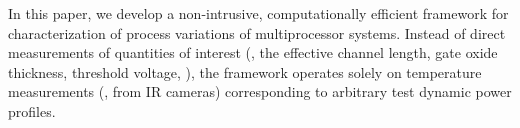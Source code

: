 In this paper, we develop a non-intrusive, computationally efficient framework for characterization of process variations of multiprocessor systems. Instead of direct measurements of quantities of interest (\eg, the effective channel length, gate oxide thickness, threshold voltage, \etc), the framework operates solely on temperature measurements (\eg, from IR cameras) corresponding to arbitrary test dynamic power profiles.
